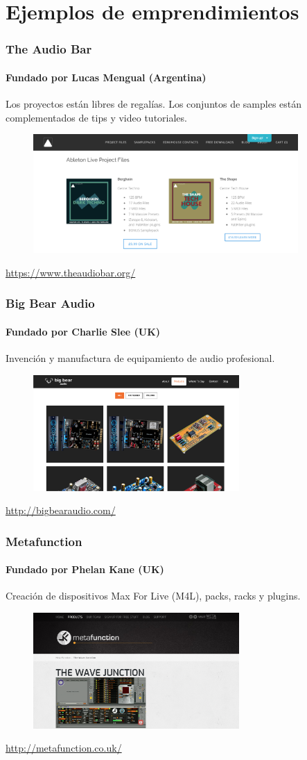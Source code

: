 \documentclass[xcolor=table]{beamer}
\begin{document}
	\section{Ejemplos de emprendimientos}
	\begin{frame}
		\frametitle{The Audio Bar}
		\framesubtitle{Fundado por Lucas Mengual (Argentina)}
		Los proyectos están libres de regalías. Los conjuntos de samples están complementados de tips y video tutoriales.
		\begin{figure}[h]
    			\centering
    			\includegraphics[width=0.9\textwidth]{images/audiobar.png}
    			\label{fig:5}
    		\end{figure}
		\url{https://www.theaudiobar.org/}
	\end{frame}
	\begin{frame}
		\frametitle{Big Bear Audio}
		\framesubtitle{Fundado por Charlie Slee (UK)}
		Invención y manufactura de equipamiento de audio profesional.
		\begin{figure}[h]
    			\centering
    			\includegraphics[width=0.7\textwidth]{images/bigbearaudio}
    			\label{fig:6}
    		\end{figure}
		\url{http://bigbearaudio.com/}
	\end{frame}
	\begin{frame}
		\frametitle{Metafunction}
		\framesubtitle{Fundado por Phelan Kane (UK)}
		Creación de dispositivos Max For Live (M4L), packs, racks y plugins.
		\begin{figure}[h]
    			\centering
    			\includegraphics[width=0.7\textwidth]{images/metafunction}
    			\label{fig:7}
    		\end{figure}
		\url{http://metafunction.co.uk/}
	\end{frame}
\end{document}
